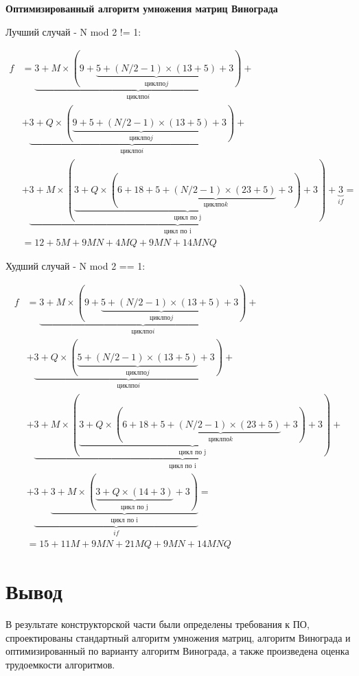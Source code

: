 \textbf{Оптимизированный алгоритм умножения матриц Винограда}

Лучший случай - N mod 2 != 1:

\begin{equation}
    \begin{aligned}
    f &=
    \underbrace{3 + M \times (9 + \underbrace{
    5 + (N/2-1) \times (13 + 5)
    }_{цикл по j} + 3)}_{цикл по i} + \\
    &+ \underbrace{3 + Q \times (\underbrace{
    9 + 5 + (N/2-1) \times (13 + 5)
    }_{цикл по j} + 3)}_{цикл по i} + \\
    &+ \underbrace{3 + M \times (\underbrace{3 + Q \times (6 + 18 + \underbrace{
    5 + (N/2-1) \times (23 + 5)
    }_{цикл по k} + 3)}_{\text{цикл по j}} + 3)}_{\text{цикл по i}} +
    \underbrace{3}_{if} = \\
    &= 12+5M+9MN+4MQ+9MN+14MNQ
    \end{aligned}
\end{equation}

Худший случай - N mod 2 == 1:

\begin{equation}
    \begin{aligned}
    f &=
    \underbrace{3 + M \times (9 + \underbrace{
    5 + (N/2-1) \times (13 + 5)
    }_{цикл по j} + 3)}_{цикл по i} + \\
    &+ \underbrace{3 + Q \times (\underbrace{
    5 + (N/2-1) \times (13 + 5)
    }_{цикл по j} + 3)}_{цикл по i} + \\
    &+ \underbrace{3 + M \times (\underbrace{3 + Q \times (6 + 18 + \underbrace{
    5 + (N/2-1) \times (23 + 5)
    }_{цикл по k} + 3)}_{\text{цикл по j}} + 3)}_{\text{цикл по i}} + \\
    &+ \underbrace{3 + 
    \underbrace{3 + M \times (\underbrace{3 + Q \times (14 + 3)}_{\text{цикл по j}} + 3)}_{\text{цикл по i}}
    }_{if} = \\
    &= 15+11M+9MN+21MQ+9MN+14MNQ
    \end{aligned}
\end{equation}

\section{Вывод}

В результате конструкторской части были определены требования к ПО, спроектированы стандартный алгоритм умножения матриц, алгоритм Винограда и оптимизированный по варианту алгоритм Винограда, а также произведена оценка трудоемкости алгоритмов.
